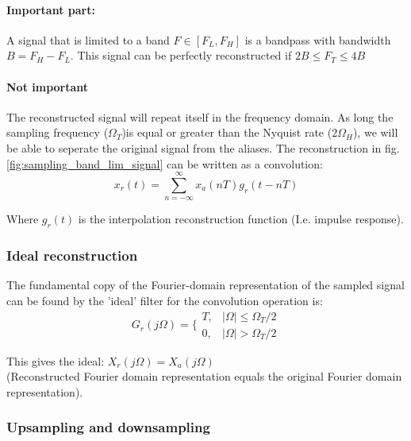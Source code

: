 \documentclass{article}
\begin{document}
\paragraph{Important part:} A signal that is limited to a band $F \in [F_L,F_H]$ is a bandpass with bandwidth $B = F_H - F_L$. This signal can be perfectly reconstructed if $2B \le F_T \le 4B$

\paragraph{Not important}The reconstructed signal will repeat itself in the frequency domain. As long the sampling frequency ($\Omega_T$)is equal or greater than the Nyquist rate ($2\Omega_H$), we will be able to seperate the original signal from the aliases. The reconstruction in fig. \ref{fig:sampling_band_lim_signal} can be written as a convolution:
\begin{equation}
    x_r (t) = \sum_{n=-\infty}^{\infty} x_a (nT) g_r (t - nT) 
\end{equation}

Where $g_r (t)$ is the interpolation reconstruction function (I.e. impulse response). 

\subsubsection{Ideal reconstruction}

The fundamental copy of the Fourier-domain representation of the sampled signal can be found by the 'ideal' filter for the convolution operation is: 
\begin{equation}
    G_r (j\Omega) = \bigg\{ \begin{matrix}
        T, & |\Omega| \leq \Omega_T /2 \\
        0, & |\Omega| > \Omega_T / 2
    \end{matrix}
\end{equation}

This gives the ideal: $X_r (j\Omega) = X_a (j\Omega)$ \\ (Reconstructed Fourier domain representation equals the original Fourier domain representation).

\clearpage
\subsubsection{Upsampling and downsampling}
\end{document}
